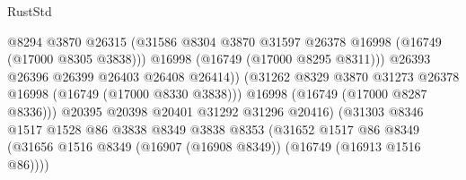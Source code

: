 \begin{lexlean}{RustStd}
\begin{coremodule}
                                              @8294
                                              @3870
                                              @26315
                                              (@31586
                                                @8304
                                                @3870
                                                @31597
                                                @26378
                                                @16998
                                                (@16749 (@17000 @8305 @3838)))
                                              @16998
                                              (@16749 (@17000 @8295 @8311)))
                                            @26393
                                            @26396
                                            @26399
                                            @26403
                                            @26408
                                            @26414))
                                        (@31262
                                          @8329
                                          @3870
                                          @31273
                                          @26378
                                          @16998
                                          (@16749 (@17000 @8330 @3838)))
                                        @16998
                                        (@16749 (@17000 @8287 @8336)))
                                      @20395
                                      @20398
                                      @20401
                                      @31292
                                      @31296
                                      @20416)
                                    (@31303
                                      @8346
                                      @1517
                                      @1528
                                      @86
                                      @3838
                                      @8349
                                      @3838
                                      @8353
                                      (@31652
                                        @1517
                                        @86
                                        @8349
                                        (@31656
                                          @1516
                                          @8349
                                          (@16907 (@16908 @8349))
                                          (@16749 (@16913 @1516 @86))))

\end{coremodule}
\end{lexlean}
